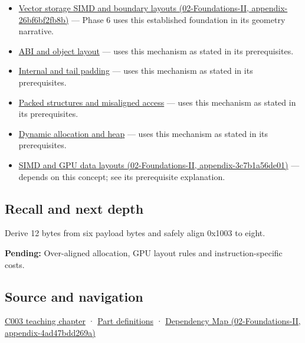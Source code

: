 \begin{itemize}
\item
  \href{}{Vector storage SIMD and boundary layouts (02-Foundations-II, appendix-26bf6bf2fb8b)} --- Phase 6 uses this established foundation in its geometry narrative.
\item
  \hyperref[appendix-c4ac6bb0fff8]{ABI and object layout} --- uses this mechanism as stated in its prerequisites.
\item
  \hyperref[appendix-f52f8c5a3afd]{Internal and tail padding} --- uses this mechanism as stated in its prerequisites.
\item
  \hyperref[appendix-0682dbfc5f0e]{Packed structures and misaligned access} --- uses this mechanism as stated in its prerequisites.
\item
  \hyperref[appendix-c3480f7d9ff3]{Dynamic allocation and heap} --- uses this mechanism as stated in its prerequisites.
\item
  \href{}{SIMD and GPU data layouts (02-Foundations-II, appendix-3c7b1a56de01)} --- depends on this concept; see its prerequisite explanation.
\end{itemize}

\subsection{Recall and next depth}\label{recall-and-next-depth}

Derive 12 bytes from six payload bytes and safely align 0x1003 to eight.

\textbf{Pending:} Over-aligned allocation, GPU layout rules and instruction-specific costs.

\subsection{Source and navigation}\label{source-and-navigation}

\href{Continuous\%20Notes/Computing\%20Foundations\%20-\%20From\%20Bits\%20to\%20C++\%20and\%20Systems\%20APIs\#Where\%20the\%20bytes\%20live}{C003 teaching chapter} · \hyperref[appendix-fd090d982a15]{Part definitions} · \href{}{Dependency Map (02-Foundations-II, appendix-4ad47bdd269a)}
